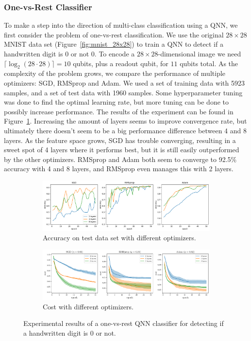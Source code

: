 \documentclass[a4paper,10pt]{article}
\begin{document}
\subsubsection{One-vs-Rest Classifier}
To make a step into the direction of multi-class classification using a QNN, we first consider the problem of one-vs-rest classification.
We use the original $28 \times 28$ MNIST data set (Figure~\ref{fig:mnist_28x28}) to train a QNN to detect if a handwritten digit is 0 or not 0.
To encode a $28 \times 28$-dimensional image we need $\lceil \log_2(28 \cdot 28) \rceil = 10$ qubits, plus a readout qubit, for $11$ qubits total.
As the complexity of the problem grows, we compare the performance of multiple optimizers: SGD, RMSprop and Adam.
We used a set of training data with 5923 samples, and a set of test data with 1960 samples.
Some hyperparameter tuning was done to find the optimal learning rate, but more tuning can be done to possibly increase performance.
The results of the experiment can be found in Figure~\ref{fig:ovr_results}.
Increasing the amount of layers seems to improve convergence rate, but ultimately there doesn't seem to be a big performance difference between 4 and 8 layers.
As the feature space grows, SGD has trouble converging, resulting in a sweet spot of 4 layers where it performs best, but it is still easily outperformed by the other optimizers.
RMSprop and Adam both seem to converge to 92.5\% accuracy with 4 and 8 layers, and RMSprop even manages this with 2 layers.
\begin{figure}[ht]
	\centering
	\begin{subfigure}{1\textwidth}
		\centering
		\includegraphics[width=1\linewidth]{figures/qnn_ovr_accuracy.png}
		\caption{Accuracy on test data set with different optimizers.}
		\vspace*{4mm}
	\end{subfigure}
	\begin{subfigure}{1\textwidth}
		\centering
		\includegraphics[width=1\linewidth]{figures/qnn_ovr_cost}
		\caption{Cost with different optimizers.}
	\end{subfigure}
	\caption{Experimental results of a one-vs-rest QNN classifier for detecting if a handwritten digit is 0 or not.}
	\label{fig:ovr_results}
\end{figure}
\end{document}
